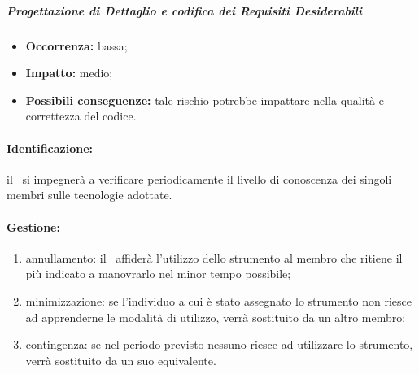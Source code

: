 \documentclass[../PianoProgetto.tex]{subfiles}
\begin{document}
		\subparagraph*{Progettazione di Dettaglio e codifica dei Requisiti Desiderabili}
			\begin{itemize}[label={-}]
				\item \textbf{Occorrenza:} bassa;
				\item \textbf{Impatto:} medio;
				\item \textbf{Possibili conseguenze:} tale rischio potrebbe impattare nella qualità e correttezza del codice.
			\end{itemize}
	
	\paragraph*{Identificazione:} il \responsabilediprogetto\ si impegnerà a verificare periodicamente il livello di conoscenza dei singoli membri sulle tecnologie adottate.
	
	\paragraph*{Gestione:}
	\begin{enumerate}
		\item annullamento: il \responsabilediprogetto\ affiderà l'utilizzo dello strumento al membro che ritiene il più indicato a manovrarlo nel minor tempo possibile;
		\item minimizzazione: se l'individuo a cui è stato assegnato lo strumento non riesce ad apprenderne le modalità di utilizzo, verrà sostituito da un altro membro;
		\item contingenza: se nel periodo previsto nessuno riesce ad utilizzare lo strumento, verrà sostituito da un suo equivalente. 
	\end{enumerate}		
	
\end{document}
